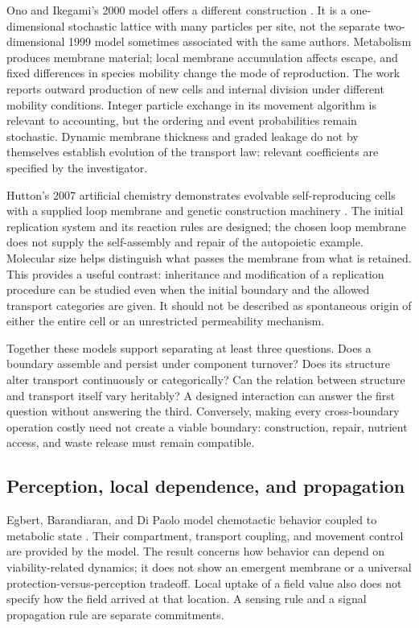 Ono and Ikegami's 2000 model offers a different construction
\citep{OnoIkegami2000}. It is a one-dimensional stochastic lattice with many
particles per site, not the separate two-dimensional 1999 model sometimes
associated with the same authors. Metabolism produces membrane material;
local membrane accumulation affects escape, and fixed differences in species
mobility change the mode of reproduction. The work reports outward production
of new cells and internal division under different mobility conditions.
Integer particle exchange in its movement algorithm is relevant to accounting,
but the ordering and event probabilities remain stochastic. Dynamic membrane
thickness and graded leakage do not by themselves establish evolution of the
transport law: relevant coefficients are specified by the investigator.

Hutton's 2007 artificial chemistry demonstrates evolvable self-reproducing
cells with a supplied loop membrane and genetic construction machinery
\citep{Hutton2007}. The initial replication system and its reaction rules are
designed; the chosen loop membrane does not supply the self-assembly and repair
of the autopoietic example. Molecular size helps distinguish what passes the
membrane from what is retained. This provides a useful contrast: inheritance
and modification of a replication procedure can be studied even when the
initial boundary and the allowed transport categories are given. It should
not be described as spontaneous origin of either the entire cell or an
unrestricted permeability mechanism.

Together these models support separating at least three questions. Does a
boundary assemble and persist under component turnover? Does its structure
alter transport continuously or categorically? Can the relation between
structure and transport itself vary heritably? A designed interaction can
answer the first question without answering the third. Conversely, making
every cross-boundary operation costly need not create a viable boundary:
construction, repair, nutrient access, and waste release must remain compatible.

\subsection{Perception, local dependence, and propagation}
Egbert, Barandiaran, and Di Paolo model chemotactic behavior coupled to
metabolic state \citep{Egbert2010}. Their compartment, transport coupling, and
movement control are provided by the model. The result concerns how behavior
can depend on viability-related dynamics; it does not show an emergent membrane
or a universal protection-versus-perception tradeoff. Local uptake of a field
value also does not specify how the field arrived at that location. A sensing
rule and a signal propagation rule are separate commitments.

